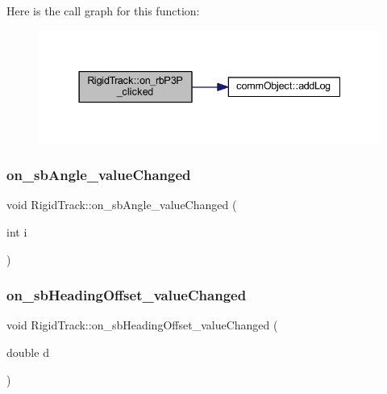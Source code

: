 Here is the call graph for this function\+:\nopagebreak
\begin{figure}[H]
\begin{center}
\leavevmode
\includegraphics[width=337pt]{class_rigid_track_ac1f10ea5ec3f718c152e245a04776454_cgraph}
\end{center}
\end{figure}
\mbox{\label{class_rigid_track_a217ca3d828c99943ea155e6891264b24}} 
\subsubsection{\texorpdfstring{on\+\_\+sb\+Angle\+\_\+value\+Changed}{on\_sbAngle\_valueChanged}}
{\footnotesize\ttfamily void Rigid\+Track\+::on\+\_\+sb\+Angle\+\_\+value\+Changed (\begin{DoxyParamCaption}\item[{int}]{i }\end{DoxyParamCaption})\hspace{0.3cm}{\ttfamily [slot]}}

\mbox{\label{class_rigid_track_a72e338d6bf93d0efa3bc503f7ca736c5}} 
\subsubsection{\texorpdfstring{on\+\_\+sb\+Heading\+Offset\+\_\+value\+Changed}{on\_sbHeadingOffset\_valueChanged}}
{\footnotesize\ttfamily void Rigid\+Track\+::on\+\_\+sb\+Heading\+Offset\+\_\+value\+Changed (\begin{DoxyParamCaption}\item[{double}]{d }\end{DoxyParamCaption})\hspace{0.3cm}{\ttfamily [slot]}}

